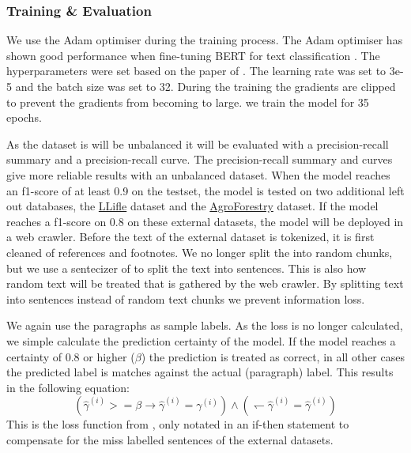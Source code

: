 \documentclass[a4paper, 12pt, oneside]{book} %
\begin{document}
\subsubsection{Training \& Evaluation}
We use the Adam optimiser \autocite{kingma_adam_2017} during the training process.
The Adam optimiser has shown good performance when fine-tuning BERT for text classification \autocite{you_large_2020}.
The hyperparameters were set based on the paper of \textcite{sun_how_2020}.
The learning rate was set to 3e-5 and the batch size was set to 32.
During the training the gradients are clipped to prevent the gradients from becoming to large.
we train the model for 35 epochs.

As the dataset is will be unbalanced it will be evaluated with a precision-recall summary and a precision-recall curve.
The precision-recall summary and curves give more reliable results with an unbalanced dataset.
When the model reaches an f1-score of at least 0.9 on the testset, the model is tested on two additional left out databases, the \href{http://www.llifle.com/}{LLifle} dataset and the \href{https://www.worldagroforestry.org/}{AgroForestry} dataset.
If the model reaches a f1-score on 0.8 on these external datasets, the model will be deployed in a web crawler.
Before the text of the external dataset is tokenized, it is first cleaned of references and footnotes.
We no longer split the into random chunks, but we use a sentecizer of \textcite{honnibal_spacy_2020} to split the text into sentences.
This is also how random text will be treated that is gathered by the web crawler.
By splitting text into sentences instead of random text chunks we prevent information loss.

We again use the paragraphs as sample labels.
As the loss is no longer calculated, we simple calculate the prediction certainty of the model.
If the model reaches a certainty of 0.8 or higher (\(\beta\)) the prediction is treated as correct, in all other cases the predicted label is matches against the actual (paragraph) label.
This results in the following equation:
\begin{equation} \label{eq:softloss_ifthen}
(\hat{\gamma}^{(i)} >= \beta \rightarrow \hat{\gamma}^{(i)} = \gamma^{(i)}) \wedge ( \leftharpoondown \hat{\gamma}^{(i)} = \hat{\gamma}^{(i)})
\end{equation}
This is the loss function from \textcite{reed_training_2015}, only notated in an if-then statement to compensate for the miss labelled sentences of the external datasets.
\end{document}
